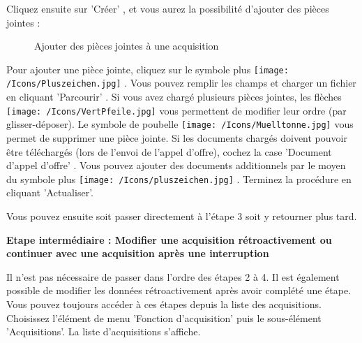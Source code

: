 \vspace{\baselineskip}

Cliquez ensuite sur 'Créer' , et vous aurez la possibilité d'ajouter des
pièces jointes :

\begin{figure}[H]
\caption{Ajouter des pièces jointes à une acquisition}
\end{figure}

Pour ajouter une pièce jointe, cliquez sur le symbole plus \texttt{[image: /Icons/Pluszeichen.jpg]} . Vous pouvez remplir les champs  et charger un fichier en cliquant 'Parcourir' . Si vous avez chargé plusieurs pièces jointes, les flèches \texttt{[image: /Icons/VertPfeile.jpg]}  vous permettent de modifier leur ordre (par glisser-déposer). Le symbole de poubelle \texttt{[image: /Icons/Muelltonne.jpg]}  vous permet de supprimer une pièce jointe.
Si les documents chargés doivent pouvoir être téléchargés (lors de l'envoi de l'appel d'offre), cochez la case 'Document d'appel d'offre' . Vous pouvez ajouter des documents additionnels par le moyen du symbole plus \texttt{[image: /Icons/pluszeichen.jpg]} . Terminez la procédure en cliquant 'Actualiser'.

\vspace{\baselineskip}

Vous pouvez ensuite soit passer directement à l'étape 3 soit y retourner plus tard.

\vspace{\baselineskip}

\textbf{Etape intermédiaire : Modifier une acquisition rétroactivement ou continuer avec une acquisition
après une interruption}

\vspace{\baselineskip}

Il n'est pas nécessaire de passer dans l'ordre des étapes 2 à 4. Il est également possible de modifier les données rétroactivement après avoir complété une étape. Vous pouvez toujours accéder à ces étapes depuis la liste des acquisitions. Choisissez l'élément de menu 'Fonction d'acquisition' puis le sous-élément 'Acquisitions'. La liste d'acquisitions s'affiche.

